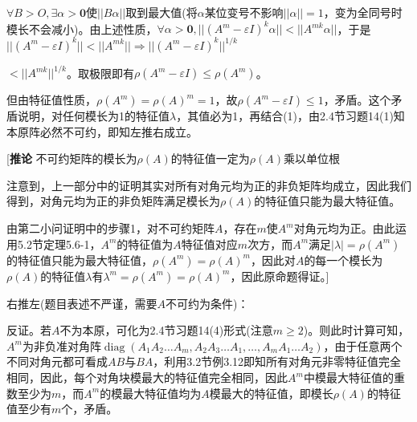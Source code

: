 \documentclass[a4paper,UTF8,fontset=windows]{ctexart}
\DeclareMathOperator{\diag}{diag}
\begin{document}
\begin{enumerate}
$\forall B>O,\exists\alpha>\mathbf{0}$使$||B\alpha||$取到最大值(将$\alpha$某位变号不影响$||\alpha||=1$，变为全同号时模长不会减小)。由上述性质，$\forall\alpha>\mathbf{0},||(A^m-\varepsilon I)^k\alpha||<||A^{mk}\alpha||$，于是$||(A^m-\varepsilon I)^k||<||A^{mk}||\Rightarrow||(A^m-\varepsilon I)^k||^{1/k}$

$<||A^{mk}||^{1/k}$。取极限即有$\rho(A^m-\varepsilon I)\le\rho(A^m)$。

但由特征值性质，$\rho(A^m)=\rho(A)^m=1$，故$\rho(A^m-\varepsilon I)\le1$，矛盾。这个矛盾说明，对任何模长为1的特征值$\lambda$，其值必为1，再结合(1)，由2.4节习题14(1)知本原阵必然不可约，即知左推右成立。

[\textbf{推论} 不可约矩阵的模长为$\rho(A)$的特征值一定为$\rho(A)$乘以单位根

注意到，上一部分中的证明其实对所有对角元均为正的非负矩阵均成立，因此我们得到，对角元均为正的非负矩阵满足模长为$\rho(A)$的特征值只能为最大特征值。

由第二小问证明中的步骤1，对不可约矩阵$A$，存在$m$使$A^m$对角元均为正。由此运用5.2节定理5.6-1，$A^m$的特征值为$A$特征值对应$m$次方，而$A^m$满足$|\lambda|=\rho(A^m)$的特征值只能为最大特征值，$\rho(A^m)=\rho(A)^m$，因此对$A$的每一个模长为$\rho(A)$的特征值$\lambda$有$\lambda^m=\rho(A^m)=\rho(A)^m$，因此原命题得证。]

右推左(题目表述不严谨，需要$A$不可约为条件)：

反证。若$A$不为本原，可化为2.4节习题14(4)形式(注意$m\ge2$)。则此时计算可知，$A^m$为非负准对角阵$\diag\left(A_1A_2\dots A_m,A_2A_3\dots A_1,\dots,A_mA_1\dots A_2\right)$，由于任意两个不同对角元都可看成$AB$与$BA$，利用3.2节例3.12即知所有对角元非零特征值完全相同，因此，每个对角块模最大的特征值完全相同，因此$A^m$中模最大特征值的重数至少为$m$，而$A^m$的模最大特征值均为$A$模最大的特征值，即模长$\rho(A)$的特征值至少有$m$个，矛盾。
\end{enumerate}
\end{document}
